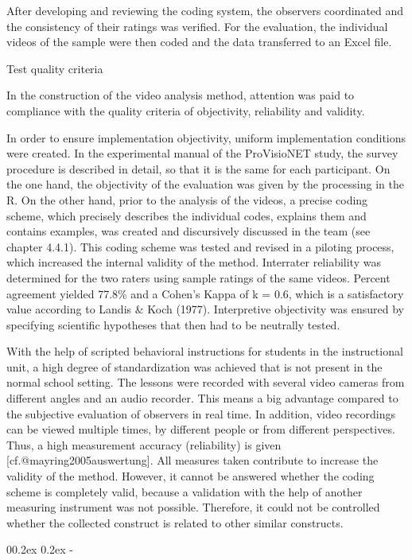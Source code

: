 \documentclass[
  man]{apa6}
\makeatletter
\let\oldsubparagraph\subparagraph
\renewcommand{\subparagraph}{
    \@ifstar
      \xxxSubParagraphStar
      \xxxSubParagraphNoStar
  }
\newcommand{\xxxSubParagraphStar}[1]{\oldsubparagraph*{#1}\mbox{}}
\newcommand{\xxxSubParagraphNoStar}[1]{\oldsubparagraph{#1}\mbox{}}
\renewcommand{\subparagraph}[1]{\@startsection{subparagraph}{5}{1em}%
  {0\baselineskip \@plus 0.2ex \@minus 0.2ex}%
  {-\z@\relax}%
  {\normalfont\normalsize\itshape\hspace{\parindent}{#1}\textit{\addperi}}{\relax}}
\makeatother
\begin{document}
After developing and reviewing the coding system, the observers coordinated and the consistency of their ratings was verified. For the evaluation, the individual videos of the sample were then coded and the data transferred to an Excel file.

Test quality criteria

In the construction of the video analysis method, attention was paid to compliance with the quality criteria of objectivity, reliability and validity.

In order to ensure implementation objectivity, uniform implementation conditions were created. In the experimental manual of the ProVisioNET study, the survey procedure is described in detail, so that it is the same for each participant. On the one hand, the objectivity of the evaluation was given by the processing in the R. On the other hand, prior to the analysis of the videos, a precise coding scheme, which precisely describes the individual codes, explains them and contains examples, was created and discursively discussed in the team (see chapter 4.4.1). This coding scheme was tested and revised in a piloting process, which increased the internal validity of the method. Interrater reliability was determined for the two raters using sample ratings of the same videos. Percent agreement yielded 77.8\% and a Cohen's Kappa of k = 0.6, which is a satisfactory value according to Landis \& Koch (1977). Interpretive objectivity was ensured by specifying scientific hypotheses that then had to be neutrally tested.

With the help of scripted behavioral instructions for students in the instructional unit, a high degree of standardization was achieved that is not present in the normal school setting. The lessons were recorded with several video cameras from different angles and an audio recorder. This means a big advantage compared to the subjective evaluation of observers in real time. In addition, video recordings can be viewed multiple times, by different people or from different perspectives. Thus, a high measurement accuracy (reliability) is given {[}cf.@mayring2005auswertung{]}. All measures taken contribute to increase the validity of the method. However, it cannot be answered whether the coding scheme is completely valid, because a validation with the help of another measuring instrument was not possible. Therefore, it could not be controlled whether the collected construct is related to other similar constructs.

\subparagraph{Coding Time on Task}\label{coding-time-on-task}
\end{document}
